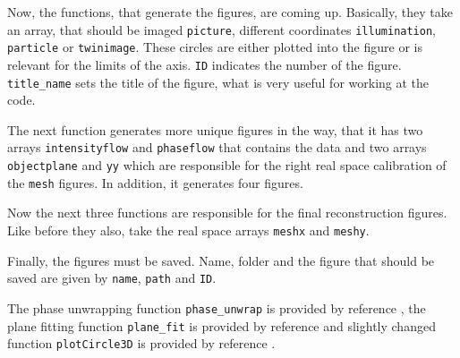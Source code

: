 \documentclass{article}
\begin{document}
Now, the functions, that generate the figures, are coming up. Basically, they take an array, that should be imaged \texttt{picture}, different coordinates \texttt{illumination}, \texttt{particle} or \texttt{twinimage}. These circles are either plotted into the figure or is relevant for the limits of the axis. \texttt{ID} indicates the number of the figure. \texttt{title\_name} sets the title of the figure, what is very useful for working at the code.





The next function generates more unique figures in the way, that it has two arrays \texttt{intensityflow} and \texttt{phaseflow} that contains the data and two arrays \texttt{objectplane} and \texttt{yy} which are responsible for the right real space calibration of the \texttt{mesh} figures. In addition, it generates four figures.

Now the next three functions are responsible for the final reconstruction figures. Like before they also, take the real space arrays \texttt{meshx} and \texttt{meshy}.



Finally, the figures must be saved. Name, folder and the figure that should be saved are given by \texttt{name}, \texttt{path} and \texttt{ID}.


The phase unwrapping function \texttt{phase\_unwrap} is provided by reference \cite{phase_unwrapp}, the plane fitting function \texttt{plane\_fit} is provided by reference \cite{plane_fit} and slightly changed function \texttt{plotCircle3D} is provided by reference \cite{plotCircle3D}. 

\end{document}
